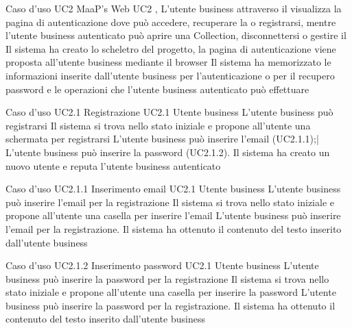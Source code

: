 \UCtitle
{Caso d'uso UC2}
{MaaP's Web}
\UC
{UC2}
{, }
{L'utente business attraverso il  visualizza la pagina di autenticazione dove può accedere, recuperare la  o registrarsi, mentre l'utente business autenticato può aprire una Collection, disconnettersi o gestire il }
{Il sistema ha creato lo scheletro del progetto, la pagina di autenticazione viene proposta all'utente business mediante il browser}
\post
{Il sistema ha memorizzato le informazioni inserite dall'utente business per l'autenticazione o per il recupero password e le operazioni che l'utente business autenticato può effettuare}



\UCtitle
{Caso d'uso UC2.1}
{Registrazione}
\UC
{UC2.1}
{Utente business}
{L'utente business può registrarsi}
{Il sistema si trova nello stato iniziale e propone all'utente una schermata per registrarsi}
\scenario
{
L'utente business può inserire l'email (UC2.1.1);|
L'utente business può inserire la password (UC2.1.2).
}
\post
{Il sistema ha creato un nuovo utente e reputa l'utente business autenticato}

\UCtitle
{Caso d'uso UC2.1.1}
{Inserimento email}
\UC
{UC2.1}
{Utente business}
{L'utente business può inserire l'email per la registrazione}
{Il sistema si trova nello stato iniziale e propone all'utente una casella per inserire l'email}
\scenario
{L'utente business può inserire l'email per la registrazione.}
\post
{Il sistema ha ottenuto il contenuto del testo inserito dall'utente business}

\UCtitle
{Caso d'uso UC2.1.2}
{Inserimento password}
\UC
{UC2.1}
{Utente business}
{L'utente business può inserire la password per la registrazione}
{Il sistema si trova nello stato iniziale e propone all'utente una casella per inserire la password}
\scenario
{L'utente business può inserire la password per la registrazione.}
\post
{Il sistema ha ottenuto il contenuto del testo inserito dall'utente business}

